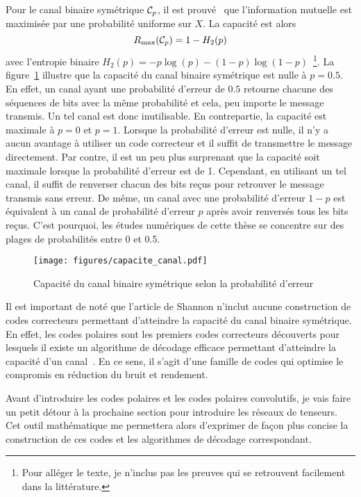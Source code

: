 Pour le canal binaire symétrique $\mathcal{C}_p$, 
il est prouvé~\cite{shannon_mathematical_1948} que l'information mutuelle
est maximisée par une probabilité uniforme sur $X$. 
La capacité est alors
\begin{equation}
  R_{\text{max}}(\mathcal{C}_p) = 1 - H_2(p)
\end{equation}
avec l'entropie binaire $H_2(p) = -p \log(p) - (1 - p)\log(1 - p)$~\footnote{
  Pour alléger le texte, je n'inclus pas les preuves qui se retrouvent facilement 
  dans la littérature.
}. 
La figure~\ref{fig:capacite_canal} illustre que la capacité du canal binaire symétrique 
est nulle à $p = 0.5$.
En effet, un canal ayant une probabilité d'erreur de $0.5$ retourne 
chacune des séquences de bits avec la même probabilité 
et cela, peu importe le message transmis.
Un tel canal est donc inutilisable.
En contrepartie, la capacité est maximale à $p = 0$ et $p = 1$.
Lorsque la probabilité d'erreur est nulle,
il n'y a aucun avantage à utiliser un code correcteur 
et il suffit de transmettre le message directement.
Par contre, il est un peu plus surprenant que la capacité soit maximale lorsque la probabilité
d'erreur est de 1.
Cependant, en utilisant un tel canal, 
il suffit de renverser chacun des bits reçus pour retrouver le message transmis sans erreur.
De même, 
un canal avec une probabilité d'erreur $1 - p$ est équivalent à un canal de probabilité d'erreur $p$
après avoir renversés tous les bits reçus.
C'est pourquoi, 
les études numériques de cette thèse se concentre sur des plages de probabilités entre 0 et 0.5.

\begin{figure}
  \begin{center}
    \texttt{[image: figures/capacite\_canal.pdf]}
  \end{center}
  \caption{Capacité du canal binaire symétrique selon la probabilité d'erreur}
  \label{fig:capacite_canal}
\end{figure}

Il est important de noté que l'article de Shannon n'inclut aucune construction de codes 
correcteurs permettant d'atteindre la capacité du canal binaire symétrique.
En effet, les codes polaires sont les premiers codes correcteurs découverts 
pour lesquels il existe un algorithme de décodage efficace permettant d'atteindre 
la capacité d'un canal~\cite{arikan_channel_2009}. 
En ce sens, il s'agit d'une famille de codes qui optimise le compromis en réduction du bruit 
et rendement.

Avant d'introduire les codes polaires et les codes polaires convolutifs,
je vais faire un petit détour à la prochaine section pour introduire les réseaux de tenseurs.
Cet outil mathématique me permettera alors d'exprimer de façon plus concise la construction
de ces codes et les algorithmes de décodage correspondant.

